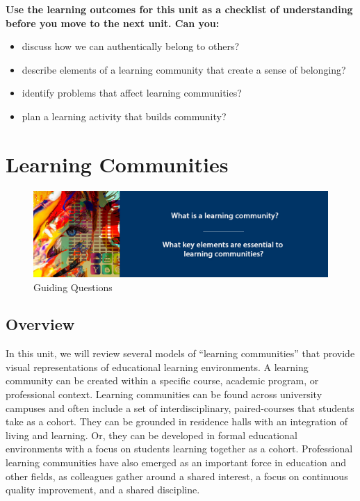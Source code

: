 \documentclass[
]{book}
\providecommand{\tightlist}{%
  \setlength{\itemsep}{0pt}\setlength{\parskip}{0pt}}
\begin{document}
\begin{progress}
\textbf{Use the learning outcomes for this unit as a checklist of
understanding before you move to the next unit. Can you:}

\begin{itemize}
\tightlist
\item
  discuss how we can authentically belong to others?\\
\item
  describe elements of a learning community that create a sense of
  belonging?\\
\item
  identify problems that affect learning communities?\\
\item
  plan a learning activity that builds community?
\end{itemize}
\end{progress}

\hypertarget{learning-communities}{%
\chapter{Learning Communities}\label{learning-communities}}

\begin{figure}
\centering
\includegraphics{assets/unit4/LDRS664-BannerUnit4.jpg}
\caption{Guiding Questions}
\end{figure}

\hypertarget{overview-3}{%
\section*{Overview}\label{overview-3}}

In this unit, we will review several models of ``learning communities'' that provide visual representations of educational learning environments. A learning community can be created within a specific course, academic program, or professional context. Learning communities can be found across university campuses and often include a set of interdisciplinary, paired-courses that students take as a cohort. They can be grounded in residence halls with an integration of living and learning. Or, they can be developed in formal educational environments with a focus on students learning together as a cohort. Professional learning communities have also emerged as an important force in education and other fields, as colleagues gather around a shared interest, a focus on continuous quality improvement, and a shared discipline.
\end{document}
